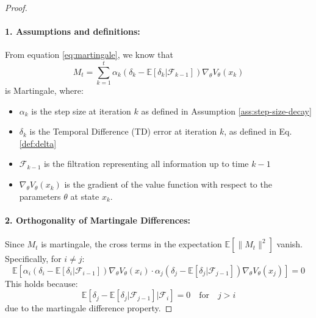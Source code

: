 \begin{proof}
\;\newline
\paragraph{1. Assumptions and definitions:}
From equation \ref{eq:martingale}, we know that
\[
M_t = \sum_{k=1}^t \alpha_k \left( \delta_k - \mathbb{E}[\delta_k | \mathcal{F}_{k-1}] \right) \nabla_\theta V_\theta(x_k)
\]
is Martingale, where:
\begin{itemize}
    \item \( \alpha_k \) is the step size at iteration \( k \) as defined in Assumption \ref{ass:step-size-decay}
    \item \( \delta_k \) is the Temporal Difference (TD) error at iteration \( k \), as defined in Eq. \ref{def:delta}
    \item \( \mathcal{F}_{k-1} \) is the filtration representing all information up to time \( k-1 \)
    \item \( \nabla_\theta V_\theta(x_k) \) is the gradient of the value function with respect to the parameters \( \theta \) at state \( x_k \).
\end{itemize}

\paragraph{2. Orthogonality of Martingale Differences:}

Since \( M_t \) is martingale, the cross terms in the expectation \( \mathbb{E}[\|M_t\|^2] \) vanish. Specifically, for \( i \neq j \):
\[
\mathbb{E}\left[ \alpha_i \left( \delta_i - \mathbb{E}[\delta_i | \mathcal{F}_{i-1}] \right) \nabla_\theta V_\theta(x_i) \cdot \alpha_j \left( \delta_j - \mathbb{E}[\delta_j | \mathcal{F}_{j-1}] \right) \nabla_\theta V_\theta(x_j) \right] = 0
\]
This holds because:
\[
\mathbb{E}\left[ \delta_j - \mathbb{E}[\delta_j | \mathcal{F}_{j-1}] \Big| \mathcal{F}_{i} \right] = 0 \quad \text{for} \quad j > i
\]
due to the martingale difference property.


\end{proof}
